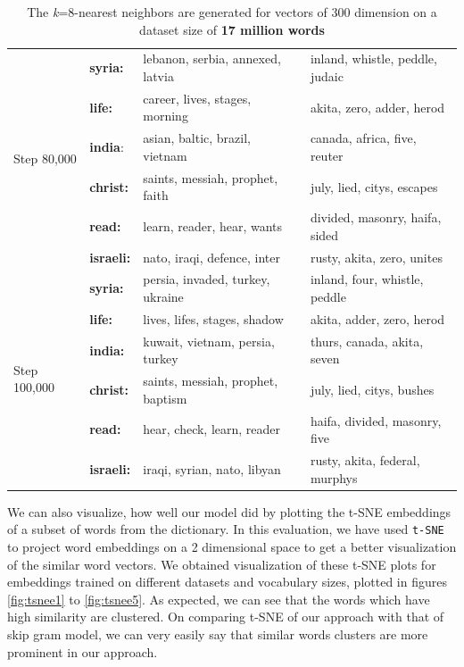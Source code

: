 \begin{table}
\begin{tabular}[htbp]{|l|l|l|l|}
		\hline
		\multirow{6}{*}{Step 80,000} 
		&\textbf{syria:}& lebanon, serbia, annexed, latvia&inland, whistle, peddle, judaic\\
		&\textbf{life:}& career, lives, stages, morning&akita, zero, adder, herod\\
		&\textbf{india}:& asian, baltic, brazil, vietnam&canada, africa, five, reuter\\
		&\textbf{christ:}& saints, messiah, prophet, faith&july, lied, citys, escapes\\
		&\textbf{read:}& learn, reader, hear, wants&divided, masonry, haifa, sided\\
		&\textbf{israeli:}& nato, iraqi, defence, inter&rusty, akita, zero, unites\\ 
		\hline
		\multirow{6}{*}{Step 100,000} 
		&\textbf{syria:}& persia, invaded, turkey, ukraine&inland, four, whistle, peddle\\
		&\textbf{life:}& lives, lifes, stages, shadow&akita, adder, zero, herod\\
		&\textbf{india:}& kuwait, vietnam, persia, turkey&thurs, canada, akita, seven\\
		&\textbf{christ:}& saints, messiah, prophet, baptism&july, lied, citys, bushes\\
		&\textbf{read:}& hear, check, learn, reader&haifa, divided, masonry, five\\
		&\textbf{israeli:}& iraqi, syrian, nato, libyan&rusty, akita, federal, murphys\\
		\hline
	\end{tabular}
	\caption{The \textit{k}=8-nearest neighbors are generated for vectors of 300 dimension on a dataset size of \textbf{17 million words}}\label{tabb:3}
\end{table}

We can also visualize, how well our model did by plotting the t-SNE embeddings of a subset of words from the dictionary.
In this evaluation, we have used \texttt{t-SNE} to project word embeddings on a 2 dimensional space to get a better visualization of the similar word vectors. We obtained visualization of these t-SNE plots for embeddings trained on different datasets and vocabulary sizes, plotted in figures \ref{fig:tsnee1} to \ref{fig:tsnee5}. As expected, we can see that the words which have high similarity are clustered. On comparing t-SNE of our approach with that of skip gram model, we can very easily say that similar words clusters are more prominent in our approach. 

